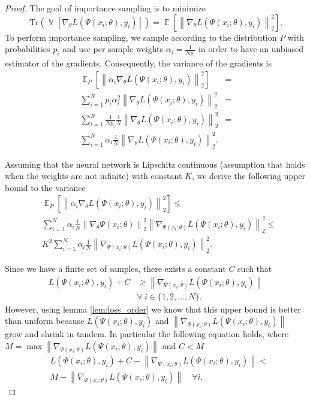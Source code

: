 \documentclass{article}
\DeclareMathOperator{\Exp}{\mathbb{E}}
\DeclareMathOperator{\Var}{\mathbb{V}}
\newcommand{\norm}[1]{\left\lVert #1 \right\rVert}
\newcommand{\E}[2][]{\Exp_{#1}\left[ #2 \right]}
\newcommand{\Tr}[1]{\text{Tr}\left( #1 \right)}
\newcommand{\V}[2][]{\Var_{#1}\left[ #2 \right]}
\begin{document}
\begin{proof}
The goal of importance sampling is to minimize
\begin{equation}
\Tr{\V{\nabla_{\theta} L(\Psi(x_i; \theta), y_i)}} = \E{\norm{\nabla_{\theta}
    L(\Psi(x_i; \theta), y_i)}_2^2}.
\end{equation}
To perform importance sampling, we sample according to the distribution $P$
with probabilities $p_i$ and use per sample weights $\alpha_i = \frac{1}{N
p_i}$ in order to have an unbiased estimator of the gradients. Consequently,
the variance of the gradients is
\begin{align}
\E[P]{\norm{\alpha_i \nabla_{\theta} L(\Psi(x_i; \theta), y_i)}_2^2} &=\\
\sum_{i=1}^N p_i \alpha_i^2 \norm{\nabla_{\theta} L(\Psi(x_i; \theta), y_i)}_2^2 &=\\
\sum_{i=1}^N \frac{1}{N p_i} \frac{1}{N} \norm{\nabla_{\theta} L(\Psi(x_i; \theta), y_i)}_2^2 &=\\
\sum_{i=1}^N \alpha_i \frac{1}{N} \norm{\nabla_{\theta} L(\Psi(x_i; \theta), y_i)}_2^2.
\end{align}

Assuming that the neural network is Lipschitz continuous (assumption that holds
when the weights are not infinite) with constant $K$, we derive the following
upper bound to the variance
\begin{align}
&\E[P]{\norm{\alpha_i \nabla_{\theta} L(\Psi(x_i; \theta), y_i)}_2^2} \leq\\
&    \sum_{i=1}^N \alpha_i \frac{1}{N} \norm{\nabla_{\theta} \Psi(x_i; \theta)}_2^2
        \norm{\nabla_{\Psi(x_i; \theta)} L(\Psi(x_i; \theta), y_i)}_2^2 \leq\\
&    K^2 \sum_{i=1}^N \alpha_i \frac{1}{N}
        \norm{\nabla_{\Psi(x_i; \theta)} L(\Psi(x_i; \theta), y_i)}_2^2. \label{eq:gnorm_upper_bound}
\end{align}

Since we have a finite set of samples, there exists a constant $C$ such that
\begin{equation}
\begin{aligned}
L(\Psi(x_i; \theta), y_i) + C &\geq
    \norm{\nabla_{\Psi(x_i; \theta)} L(\Psi(x_i; \theta), y_i)} \\
& \forall \ i \in \{1, 2, \dots, N\}. \label{eq:loss_upper_bound}
\end{aligned}
\end{equation}
However, using lemma \ref{lem:loss_order} we know that this upper bound is
better than uniform because $L(\Psi(x_i; \theta), y_i)$ and
$\norm{\nabla_{\Psi(x_i; \theta)} L(\Psi(x_i; \theta), y_i)}$ grow and shrink
in tandem. In particular the following equation holds, where $M = \max
\norm{\nabla_{\Psi(x_i; \theta)} L(\Psi(x_i; \theta), y_i)}$ and $C < M$
\begin{equation} \label{eq:loss_upper_bound2}
\begin{aligned}
& L(\Psi(x_i; \theta), y_i) + C - \norm{\nabla_{\Psi(x_i; \theta)}
  L(\Psi(x_i; \theta), y_i)} < \\
& M - \norm{\nabla_{\Psi(x_i; \theta)}
  L(\Psi(x_i; \theta), y_i)} \quad \forall i.
\end{aligned}
\end{equation}


\end{proof}
\end{document}
